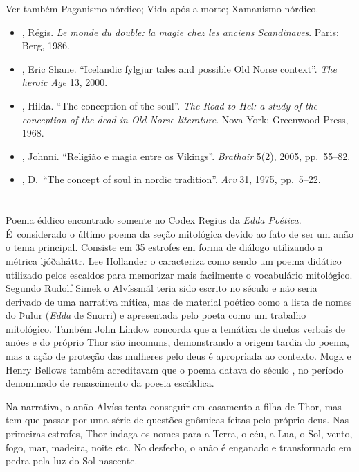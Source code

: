 Ver também Paganismo nórdico; Vida após a morte; Xamanismo nórdico.



\begin{itemize}\footnotesize
\item
  , Régis. \emph{Le monde du double: la magie chez les anciens
  Scandinaves}. Paris: Berg, 1986.
\item
  , Eric Shane. ``Icelandic fylgjur tales and possible Old Norse
  context''. \emph{The heroic Age} 13, 2000.
\item
  , Hilda. ``The conception of the soul''. \emph{The Road to Hel: a
  study of the conception of the dead in Old Norse literature}. Nova
  York: Greenwood Press, 1968.
\item
  , Johnni. ``Religião e magia entre os Vikings''. \emph{Brathair}
  5(2), 2005, pp.~55--82.
\item
  , D.~``The concept of soul in nordic tradition''. \emph{Arv} 31,
  1975, pp.~5--22.
\end{itemize}

\section{}

Poema éddico encontrado somente no Codex Regius da \emph{Edda Poética}.
É~considerado o último poema da seção mitológica devido ao fato de ser
um anão o tema principal. Consiste em 35 estrofes em forma de diálogo
utilizando a métrica ljóðaháttr. Lee Hollander o caracteriza como sendo
um poema didático utilizado pelos escaldos para memorizar mais
facilmente o vocabulário mitológico. Segundo Rudolf Simek o Alvíssmál
teria sido escrito no século  e não seria derivado de uma narrativa
mítica, mas de material poético como a lista de nomes do Þulur
(\emph{Edda} de Snorri) e apresentada pelo poeta como um trabalho
mitológico. Também John Lindow concorda que a temática de duelos verbais
de anões e do próprio Thor são incomuns, demonstrando a origem tardia do
poema, mas a ação de proteção das mulheres pelo deus é apropriada ao
contexto. Mogk e Henry Bellows também acreditavam que o poema datava do
século , no período denominado de renascimento da poesia escáldica.

Na narrativa, o anão Alvíss tenta conseguir em casamento a filha de
Thor, mas tem que passar por uma série de questões gnômicas feitas pelo
próprio deus. Nas primeiras estrofes, Thor indaga os nomes para a Terra,
o céu, a Lua, o Sol, vento, fogo, mar, madeira, noite etc. No desfecho,
o anão é enganado e transformado em pedra pela luz do Sol nascente.

